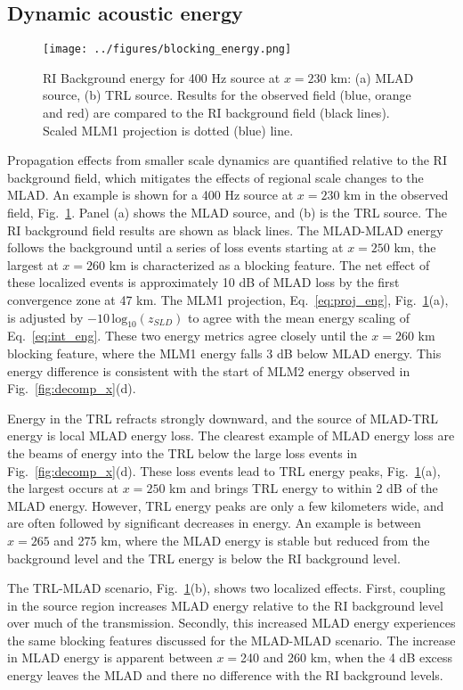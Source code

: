 \documentclass[preprint,NumberedRefs]{JASA}
\begin{document}
\subsection{Dynamic acoustic energy}\label{ssec:blocking}
\begin{figure}
\texttt{[image: ../figures/blocking\_energy.png]}
    \caption{RI Background energy for 400 Hz source at $x=230$ km: (a) MLAD source, (b) TRL source. Results for the observed field (blue, orange and red) are compared to the RI background field (black lines). Scaled MLM1 projection is dotted (blue) line.}
    \label{fig:ml_energy}
\end{figure}

Propagation effects from smaller scale dynamics are quantified relative to the RI background field, which mitigates the effects of regional scale changes to the MLAD. An example is shown for a 400 Hz source at $x=230$ km in the observed field, Fig.~\ref{fig:ml_energy}. Panel (a) shows the MLAD source, and (b) is the TRL source. The RI background field results are shown as black lines. The MLAD-MLAD energy follows the background until a series of loss events starting at $x=250$ km, the largest at $x=260$ km is characterized as a blocking feature. The net effect of these localized events is approximately 10 dB of MLAD loss by the first convergence zone at 47 km. The MLM1 projection, Eq.~\eqref{eq:proj_eng}, Fig.~\ref{fig:ml_energy}(a), is adjusted by $-10 \, \textrm{log}_{10}(z_{SLD})$ to agree with the mean energy scaling of Eq.~\eqref{eq:int_eng}. These two energy metrics agree closely until the $x=260$ km blocking feature, where the MLM1 energy falls 3 dB below MLAD energy. This energy difference is consistent with the start of MLM2 energy observed in Fig.~\ref{fig:decomp_x}(d).

Energy in the TRL refracts strongly downward, and the source of MLAD-TRL energy is local MLAD energy loss. The clearest example of MLAD energy loss are the beams of energy into the TRL below the large loss events in Fig.~\ref{fig:decomp_x}(d). These loss events lead to TRL energy peaks, Fig.~\ref{fig:ml_energy}(a), the largest occurs at $x=250$ km and brings TRL energy to within 2 dB of the MLAD energy. However, TRL energy peaks are only a few kilometers wide, and are often followed by significant decreases in energy. An example is between $x=265$ and 275 km, where the MLAD energy is stable but reduced from the background level and the TRL energy is below the RI background level.

The TRL-MLAD scenario, Fig.~\ref{fig:ml_energy}(b), shows two localized effects. First, coupling in the source region increases MLAD energy relative to the RI background level over much of the transmission. Secondly, this increased MLAD energy experiences the same blocking features discussed for the MLAD-MLAD scenario. The increase in MLAD energy is apparent between $x=$240 and 260 km, when the 4 dB excess energy leaves the MLAD and there no difference with the RI background levels.
\end{document}
